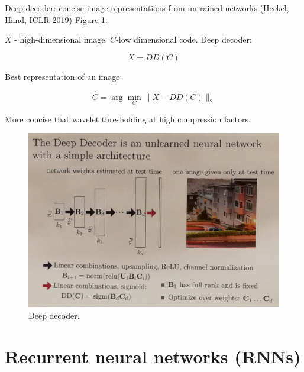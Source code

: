 \documentclass[english]{article}
\begin{document}
\item Deep decoder: concise image representations from untrained networks (Heckel, Hand, ICLR 2019) Figure \ref{DD}.

$X$ - high-dimensional image. $C$-low dimensional code. Deep decoder: 

$$X = DD(C)$$

Best representation of an image: 

$$\hat C = \arg\min_C\|X-DD(C)\|_2$$

More concise that wavelet thresholding at high compression factors. 


\begin{figure}
  \centering
  \includegraphics[scale=0.6]{DD}
  \caption{Deep decoder.}
  \label{DD}
\end{figure}

\eenum 








\section{Recurrent neural networks (RNNs)}
\end{document}
